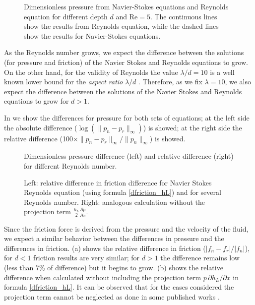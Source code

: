 \begin{figure}[ht]
 \centering 
 \def\svgwidth{\textwidth}\small{
}
\caption[Dimensionless pressure from Navier-Stokes equations and Reynolds equation for different depths.]{Dimensionless pressure from Navier-Stokes equations and Reynolds equation for different depth $d$ and Re${}=5$. The continuous lines show the results from Reynolds equation, while the dashed lines show the results for Navier-Stokes equations.}\label{fig:varying_d_Re_5}	
\end{figure}
As the Reynolds number grows, we expect the difference between the solutions (for pressure and friction) of the Navier Stokes and Reynolds equations to grow. On the other hand, for the validity of Reynolds the value $\lambda/d=10$ is a well known lower bound for the \emph{aspect ratio} $\lambda/d$ \cite{dobrica08}. Therefore, as we fix $\lambda=10$, we also expect the difference between the solutions of the Navier Stokes and Reynolds equations to grow for $d>1$.

In  we show the differences for pressure for both sets of equations; at the left side the absolute difference ($\log(\|p_n-p_r\|_\infty)$) is showed; at the right side the relative difference (100$\times\|p_n-p_r\|_\infty/\|p_n\|_\infty$) is showed.
\begin{figure}
\centering
\def\svgwidth{\textwidth}
\footnotesize{
}
\caption[Dimensionless pressure differences (absolute and relative) between Reynolds and Navier Stokes Equations with different Reynolds number]{Dimensionless pressure difference (left) and relative difference (right) for different Reynolds number.}\label{fig:pres_nvs_rey_diff} 
\end{figure}
\begin{figure}
\centering
\def\svgwidth{\textwidth}	
\footnotesize{
}
\caption[Relative differences in friction between Reynolds and Navier Stokes Equations with several Reynolds number for the correct and wrong formulas]{Left: relative difference in friction difference for Navier Stokes Reynolds equation (using formula \eqref*{dfriction_hL}) and  for several Reynolds number. Right: analogous calculation without the projection term $\frac{h_L}{2}\frac{\partial p}{\partial x}$.}\label{fig:friction_nvs_rey_diff} 
\end{figure}

Since the friction force is derived from the pressure and the velocity of the fluid, we expect a similar behavior between the differences in pressure and the differences in friction. (a) shows the relative difference in friction ($|f_n-f_r|/|f_n|$), for $d<1$ friction results are very similar; for $d>1$ the difference remains low (less than 7\% of difference) but it begins to grow. (b) shows the relative difference when calculated without including the projection term $p\, \partial h_L/\partial x$ in formula \eqref*{dfriction_hL}. It can be observed that for the cases considered the projection term cannot be neglected as done in some published works \cite{mezghani2012,tomanik2013,organisciak2007phd}.

